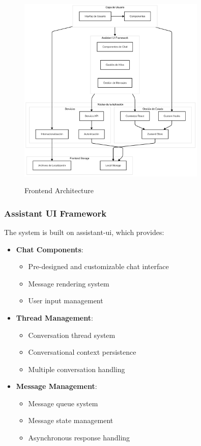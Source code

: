 \begin{figure}[H]
	\centering
	\includegraphics[width=0.8\textwidth]{figuras/frontend.png}
	\label{fig:arquitectura-frontend}
	\caption{Frontend Architecture}
\end{figure}

\subsubsection{Assistant UI Framework}
\label{assistant-ui}

The system is built on \gls{assistant-ui}, which provides:

\begin{itemize}
	\item \textbf{Chat Components}:
	      \begin{itemize}
		      \item Pre-designed and customizable chat interface
		      \item Message rendering system
		      \item User input management
	      \end{itemize}

	\item \textbf{Thread Management}:
	      \begin{itemize}
		      \item Conversation thread system
		      \item Conversational context persistence
		      \item Multiple conversation handling
	      \end{itemize}

	\item \textbf{Message Management}:
	      \begin{itemize}
		      \item Message queue system
		      \item Message state management
		      \item Asynchronous response handling
	      \end{itemize}
\end{itemize}
